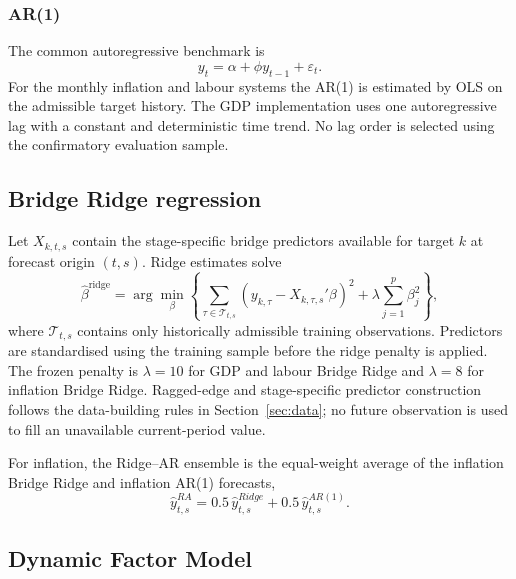 \subsubsection{AR(1)}

The common autoregressive benchmark is
\begin{equation}
    y_t = \alpha + \phi y_{t-1}+\varepsilon_t.
    \label{eq:ar1}
\end{equation}
For the monthly inflation and labour systems the AR(1) is estimated by OLS on
the admissible target history. The GDP implementation uses one autoregressive
lag with a constant and deterministic time trend. No lag order is selected
using the confirmatory evaluation sample.

\subsection{Bridge Ridge regression}
\label{subsec:bridge_ridge}

Let \(X_{k,t,s}\) contain the stage-specific bridge predictors available for
target \(k\) at forecast origin \((t,s)\). Ridge estimates solve
\begin{equation}
    \widehat{\beta}^{\mathrm{ridge}}
    =
    \arg\min_{\beta}
    \left\{
        \sum_{\tau\in\mathcal{T}_{t,s}}
        \left(y_{k,\tau}-X_{k,\tau,s}'\beta\right)^2
        +
        \lambda\sum_{j=1}^{p}\beta_j^2
    \right\},
    \label{eq:ridge}
\end{equation}
where \(\mathcal{T}_{t,s}\) contains only historically admissible training
observations. Predictors are standardised using the training sample before the
ridge penalty is applied. The frozen penalty is \(\lambda=10\) for GDP and
labour Bridge Ridge and \(\lambda=8\) for inflation Bridge Ridge. Ragged-edge
and stage-specific predictor construction follows the data-building rules in
Section~\ref{sec:data}; no future observation is used to fill an unavailable
current-period value.

For inflation, the Ridge--AR ensemble is the equal-weight average of the
inflation Bridge Ridge and inflation AR(1) forecasts,
\[
    \widehat y^{RA}_{t,s}
    =
    0.5\,\widehat y^{Ridge}_{t,s}
    +
    0.5\,\widehat y^{AR(1)}_{t,s}.
\]

\subsection{Dynamic Factor Model}
\label{subsec:dfm}

